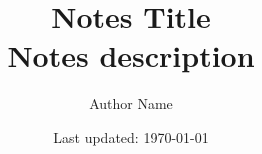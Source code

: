 
\title{%
  Notes Title
  \\[1em]
  \normalsize{Notes description}
}

\author{%
  \normalsize{Author Name}
}

\date{%
  \normalsize
  \vspace{-1ex}Last updated: \today
}

\maketitle
\label{sec:contents}
\tableofcontents
